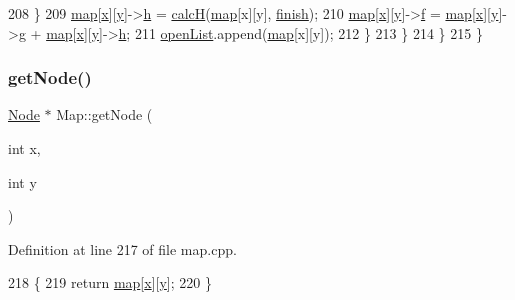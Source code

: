 \begin{DoxyCode}
208                 \}
209                 \hyperlink{class_map_a7298e7a7b5dbdc642c49ded9a2c754a5}{map}[\hyperlink{class_node_aff1029a518bdc2651007b8856f958364}{x}][\hyperlink{class_node_aa3e5b5240023b4528ae85057b3324202}{y}]->\hyperlink{class_node_afb5a7ac7536a9e09488bb685420cd78a}{h} = \hyperlink{class_map_a0c1055f7616a6779a7f5f1d561a8ccb2}{calcH}(\hyperlink{class_map_a7298e7a7b5dbdc642c49ded9a2c754a5}{map}[x][y], \hyperlink{class_map_abdb357cb53c27be3b6e3c2b54bfde669}{finish});
210                 \hyperlink{class_map_a7298e7a7b5dbdc642c49ded9a2c754a5}{map}[\hyperlink{class_node_aff1029a518bdc2651007b8856f958364}{x}][\hyperlink{class_node_aa3e5b5240023b4528ae85057b3324202}{y}]->\hyperlink{class_node_a32fbe9e0f4fc9e9d1845ce808738d7ab}{f} = \hyperlink{class_map_a7298e7a7b5dbdc642c49ded9a2c754a5}{map}[\hyperlink{class_node_aff1029a518bdc2651007b8856f958364}{x}][\hyperlink{class_node_aa3e5b5240023b4528ae85057b3324202}{y}]->\hyperlink{class_node_a0b249888eacdec6c623ec8c58b230c48}{g} + \hyperlink{class_map_a7298e7a7b5dbdc642c49ded9a2c754a5}{map}[\hyperlink{class_node_aff1029a518bdc2651007b8856f958364}{x}][\hyperlink{class_node_aa3e5b5240023b4528ae85057b3324202}{y}]->\hyperlink{class_node_afb5a7ac7536a9e09488bb685420cd78a}{h};
211                 \hyperlink{class_map_ab19ca30427e7257d713f5fcfa0ac1a10}{openList}.append(\hyperlink{class_map_a7298e7a7b5dbdc642c49ded9a2c754a5}{map}[x][y]);
212             \}
213         \}
214     \}
215 \}
\end{DoxyCode}
\mbox{\label{class_map_a9500f43b02ce38b5e89248bd6e257858}} 
\subsubsection{\texorpdfstring{get\+Node()}{getNode()}}
{\footnotesize\ttfamily \hyperlink{class_node}{Node} $\ast$ Map\+::get\+Node (\begin{DoxyParamCaption}\item[{int}]{x,  }\item[{int}]{y }\end{DoxyParamCaption})}



Definition at line 217 of file map.\+cpp.


\begin{DoxyCode}
218 \{
219     \textcolor{keywordflow}{return} \hyperlink{class_map_a7298e7a7b5dbdc642c49ded9a2c754a5}{map}[\hyperlink{class_node_aff1029a518bdc2651007b8856f958364}{x}][\hyperlink{class_node_aa3e5b5240023b4528ae85057b3324202}{y}];
220 \}
\end{DoxyCode}
\mbox{\label{class_map_a19461c64e6da374e8022d210a6930867}} 
